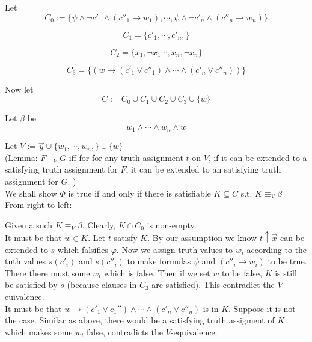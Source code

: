 \documentclass[12pt]{article}
\begin{document}
Let $$C_0:=\{\psi\wedge \neg c'_1\wedge  (c''_1\rightarrow w_1) , \cdots, \psi\wedge\neg c'_n\wedge (c''_n\rightarrow w_n)\}$$

$$C_1=\{c'_1, \cdots, c'_n, \}$$

$$C_2=\{x_1,\neg x_1\cdots, x_n,\neg x_n\}$$

$$C_3=\{(w\rightarrow (c'_1\vee c''_1)\wedge\cdots\wedge (c'_n\vee c''_n))\}$$

Now let $$C:=C_0\cup C_1\cup C_2\cup C_3\cup\{w\}$$

Let $\beta$ be $$ w_1\wedge\cdots\wedge w_n\wedge w$$

Let $V:=\vec{y}\cup\{w_1,\cdots,w_n,\}\cup\{w\}$\\




(Lemma: $F\models_V G$ iff for for any truth assignment $t$ on $V$, if it can be extended to a satisfying truth assignment for $F$, it can be extended to an satisfying truth assignment for $G$. 
) \\

We shall show $\Phi$ is true if and only if there is satisfiable $K\subseteq C$ s.t. $K\equiv_V \beta$\\



\color{red} From right to left:\color{black}

Given a such $K\equiv_V \beta$. 
Clearly, $K\cap C_0$ is non-empty.\\



It must be that $w\in K$. 
Let $t$ satisfy $K$. 
By our assumption we know $t\uparrow\vec{x}$ can be extended to $s$ which falsifies $\varphi$. Now we assign truth values to $w_i$ according to the tuth values $s(c'_i)$ and $s(c''_i)$ to make formulas $\psi$ and  $(c''_i\rightarrow w_i)$ to be true. There there must some $w_i$ which is false. Then if we set $w$ to be false, $K$ is still be satisfied by $s$ (because clauses in $C_3$ are satisfied). This contradict the $V$-euivalence.\\

It must be that $w\rightarrow (c'_1\vee c_1'')\wedge\cdots\wedge (c'_n\vee c''_n)$ is in $K$. Suppose it is not the case. Similar as above, there would be a satisfying truth assigment of $K$ which makes some $w_i$ false, contradicts the $V$-equivalence. \\
\end{document}
